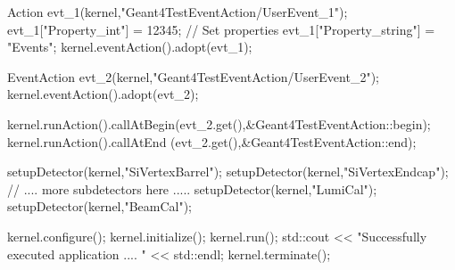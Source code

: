 \documentclass[10pt,a4paper]{article}
\begin{document}
\begin{code}
{  Action evt_1(kernel,"Geant4TestEventAction/UserEvent_1");
  evt_1["Property_int"] = 12345;                    // Set properties
  evt_1["Property_string"] = "Events";
  kernel.eventAction().adopt(evt_1);

  EventAction evt_2(kernel,"Geant4TestEventAction/UserEvent_2");
  kernel.eventAction().adopt(evt_2);

  kernel.runAction().callAtBegin(evt_2.get(),&Geant4TestEventAction::begin);
  kernel.runAction().callAtEnd  (evt_2.get(),&Geant4TestEventAction::end);
 
  setupDetector(kernel,"SiVertexBarrel");
  setupDetector(kernel,"SiVertexEndcap");
  // .... more subdetectors here .....
  setupDetector(kernel,"LumiCal");
  setupDetector(kernel,"BeamCal");

  kernel.configure();
  kernel.initialize();
  kernel.run();
  std::cout << "Successfully executed application .... " << std::endl;
  kernel.terminate();
}
\end{code}
\end{document}
